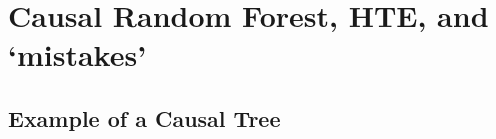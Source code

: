 \newpage


\section{Causal Random Forest, HTE, and `mistakes'}

\subsection{Example of a Causal Tree}

